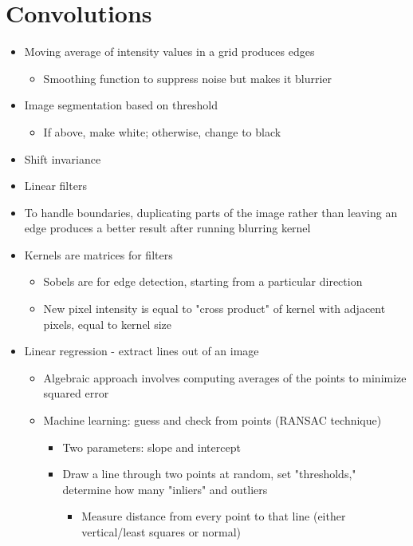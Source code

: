\documentclass{article}
\begin{document}
\section*{Convolutions}
\begin{itemize}
	\item Moving average of intensity values in a grid produces edges 
      \begin{itemize}
      \item Smoothing function to suppress noise but makes it blurrier 
      \end{itemize}
	\item Image segmentation based on threshold 
      \begin{itemize}
      \item If above, make white; otherwise, change to black 
      \end{itemize}
    \item Shift invariance 
    \item Linear filters 
    \item To handle boundaries, duplicating parts of the image rather than leaving an edge produces a better result after running blurring kernel 
    \item Kernels are matrices for filters 
      \begin{itemize}
      \item Sobels are for edge detection, starting from a particular direction 
      \item New pixel intensity is equal to "cross product" of kernel with adjacent pixels, equal to kernel size 
      \end{itemize}
	\item Linear regression - extract lines out of an image 
      \begin{itemize}
      \item Algebraic approach involves computing averages of the points to minimize squared error
      \item Machine learning: guess and check from points (RANSAC technique)
      \begin{itemize}
      \item Two parameters: slope and intercept 
      \item Draw a line through two points at random, set "thresholds," determine how many "inliers" and outliers 
      \begin{itemize}
      \item Measure distance from every point to that line (either vertical/least squares or normal)

\end{itemize}
\end{itemize}
\end{itemize}
\end{itemize}
\end{document}
